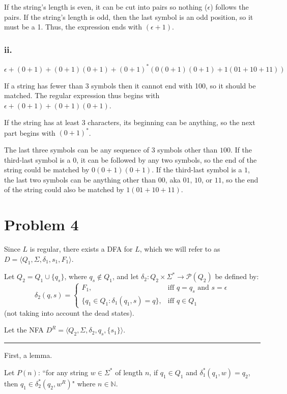 \documentclass[12pt]{article}
\newcommand{\N}{\mathbb{N}}
\begin{document}
If the string's length is even, it can be cut into pairs so nothing ($\epsilon$) follows the pairs. If the string's length is odd, then the last symbol is an odd position, so it must be a 1. Thus, the expression ends with $(\epsilon + 1)$.

\subsubsection*{ii.}
\[ \epsilon + (0+1) + (0+1)(0+1) + (0+1)^* (0(0+1)(0+1) + 1(01+10+11)) \]

If a string has fewer than 3 symbols then it cannot end with 100, so it should be matched. The regular expression thus begins with $\epsilon + (0+1) + (0+1)(0+1)$.

If the string has at least 3 characters, its beginning can be anything, so the next part begins with $(0 + 1)^*$.

The last three symbols can be any sequence of 3 symbols other than $100$. If the third-last symbol is a $0$, it can be followed by any two symbols, so the end of the string could be matched by $0(0+1)(0+1)$. If the third-last symbol is a $1$, the last two symbols can be anything other than $00$, aka $01$, $10$, or $11$, so the end of the string could also be matched by $1 (01 + 10 + 11)$.

\newpage
\section*{Problem 4}
Since $L$ is regular, there exists a DFA for $L$, which we will refer to as $D = \langle Q_1, \Sigma, \delta_1, s_1, F_1 \rangle$.

Let $Q_2 = Q_1 \cup \{ q_s \}$, where $q_s \notin Q_1$, and let $\delta_2: Q_2 \times \Sigma^* \to \mathcal P(Q_2)$ be defined by:
\[
\delta_2 (q, s) = \begin{cases}
F_1, & \text{iff } q = q_s \text{ and } s = \epsilon \\
\{ q_1 \in Q_1 : \delta_1(q_1, s) = q \}, & \text{iff } q \in Q_1
\end{cases}
\]
(not taking into account the dead states).

Let the NFA $D^R = \langle Q_2, \Sigma, \delta_2, q_s, \{s_1\} \rangle$.

\hfill

\hrule

\hfill

\noindent First, a lemma.

Let $P(n)$: ``for any string $w \in \Sigma^*$ of length $n$, if $q_1 \in Q_1$ and $\delta_1^*(q_1, w) = q_2$, then $q_1 \in \delta_2^*(q_2, w^R)$" where $n \in \N$.
\end{document}
